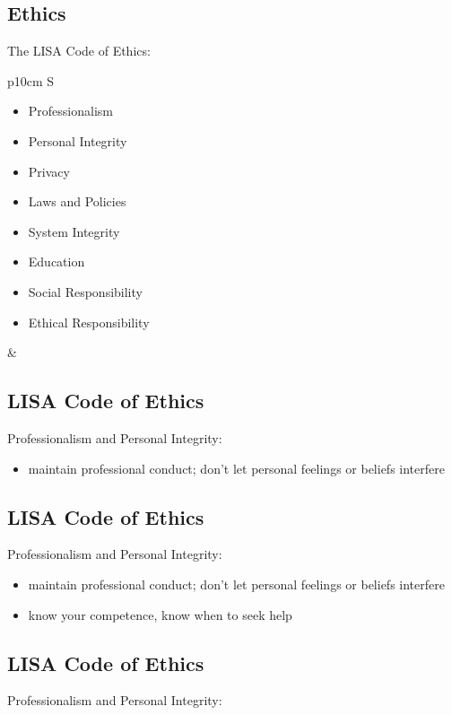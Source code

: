 \documentclass[xga]{xdvislides}
\begin{document}
\subsection{Ethics}
The LISA Code of Ethics:
\\

\begin{tabular}{ p{10cm} S }
\begin{itemize}
	\item Professionalism
	\item Personal Integrity
	\item Privacy
	\item Laws and Policies
	\item System Integrity
	\item Education
	\item Social Responsibility
	\item Ethical Responsibility
\end{itemize}
&  \\
\end{tabular}

\subsection{LISA Code of Ethics}
Professionalism and Personal Integrity:

\begin{itemize}
	\item maintain professional conduct; don't let
personal feelings or beliefs interfere
\end{itemize}

\subsection{LISA Code of Ethics}
Professionalism and Personal Integrity:

\begin{itemize}
	\item maintain professional conduct; don't let
personal feelings or beliefs interfere
	\item know your competence, know when to seek help
\end{itemize}

\subsection{LISA Code of Ethics}
Professionalism and Personal Integrity:
\end{document}
